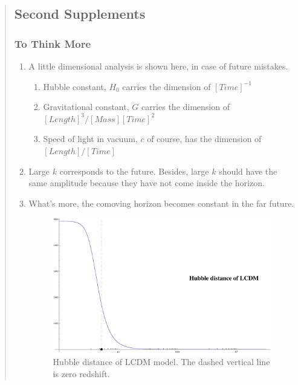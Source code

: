 \documentclass{article}
\begin{document}
\begin{quotation}
{\color{JungleGreen}
\subsection{Second Supplements}


\subsubsection{To Think More}

\begin{enumerate}

\item
A little dimensional analysis is shown here, in case of future mistakes.
\begin{enumerate}
\item
Hubble constant, $H_0$ carries the dimension of $[Time]^{-1}$
\item
Gravitational constant, $G$ carries the dimension of $[Length]^3/[Mass][Time]^2$
\item
Speed of light in vacuum, $c$ of course, has the dimension of $[Length]/[Time]$

\end{enumerate}


\item
Large $k$ corresponds to the future. Besides, large $k$ should have the same amplitude because they have not come inside the horizon.

\item
What's more, the comoving horizon becomes constant in the far future.

\begin{figure}[!htpb]
\centering
\includegraphics[width=350pt]{HubbleDistanceOfLCDM_Marked.eps}
\caption{\color{JungleGreen}Hubble distance of LCDM model. The dashed vertical line is zero redshift.}\label{fig:DE_Supp_HubbleDistances}
\end{figure}


\end{enumerate}}
\end{quotation}
\end{document}
